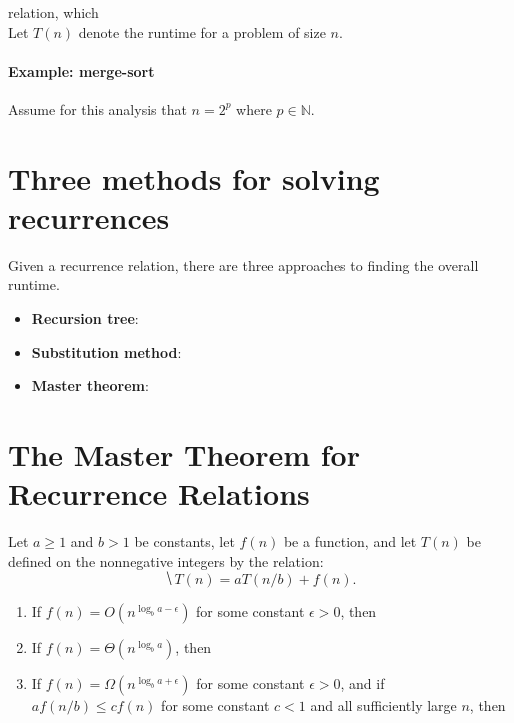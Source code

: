 \documentclass[11  pt]{article}
\begin{document}
relation, which \\

Let $T(n)$ denote the runtime for a problem of size $n$. \\

\paragraph{Example: merge-sort}
Assume for this analysis that $n = 2^p$ where $p \in \mathbb{N}$. \\


\newpage


\section{Three methods for solving recurrences}
Given a recurrence relation, there are three approaches to finding the overall runtime.
\begin{itemize}
\item \textbf{Recursion tree}: 
\item \textbf{Substitution method}: 
\item \textbf{Master theorem}: 
\end{itemize}

\newpage
\section{The Master Theorem for Recurrence Relations}
\begin{theorem}
	Let $a \geq 1$ and $b > 1$ be constants, let $f(n)$ be a function, and let $T(n)$ be defined on the nonnegative integers by the relation:
	\begin{equation*}
		\hide{T(n) = aT(n/b) + f(n).}
	\end{equation*}
	\begin{enumerate}
		\itemsep = 4em
		\item If $f(n) = O(n^{\log_b a - \epsilon})$ for some constant $\epsilon > 0$, then 
		\item If $f(n) = \Theta(n^{\log_b a})$, then 
		\item If $f(n) = \Omega(n^{\log_b a + \epsilon})$ for some constant $\epsilon > 0$, and if $a f(n/b) \leq c f(n)$ for some constant $c < 1$ and all sufficiently large $n$, then 
	\end{enumerate}
\end{theorem}
\end{document}
